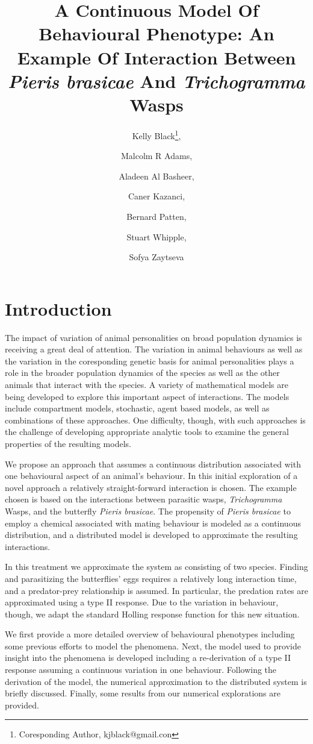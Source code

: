\documentclass[12pt]{article}
\title{A Continuous Model Of Behavioural Phenotype: An Example Of
  Interaction Between \textit{Pieris brasicae} And
  \textit{Trichogramma} Wasps}
\author{Kelly Black\thanks{Coresponding Author, kjblack@gmail.con},
  \and Malcolm R Adams, \and Aladeen Al Basheer, \and Caner Kazanci,
  \and Bernard Patten, \and Stuart Whipple, \and Sofya Zaytseva}
\begin{document}
\maketitle

\section{Introduction}

The impact of variation of animal personalities on broad population
dynamics is receiving a great deal of
attention\cite{doi:10.1111/j.1461-0248.2010.01536.x}.  The variation
in animal behaviours as well as the variation in the coresponding
genetic basis for animal personalities plays a role in the broader
population dynamics of the species as well as the other animals that
interact with the species. A variety of mathematical models are being
developed to explore this important aspect of interactions. The models
include compartment models, stochastic, agent based models, as well as
combinations of these approaches. One difficulty, though, with such
approaches is the challenge of developing appropriate analytic tools
to examine the general properties of the resulting models.

We propose an approach that assumes a continuous distribution
associated with one behavioural aspect of an animal's behaviour. In
this initial exploration of a novel approach a relatively
straight-forward interaction is chosen. The example chosen is based on
the interactions between parasitic wasps, \textit{Trichogramma} Wasps,
and the butterfly \textit{Pieris
  brasicae}\cite{10.1093/beheco/arq007}.  The propensity of
\textit{Pieris brasicae} to employ a chemical associated with mating
behaviour is modeled as a continuous distribution, and a distributed
model is developed to approximate the resulting interactions.

In this treatment we approximate the system as consisting of two
species. Finding and parasitizing the butterflies' eggs requires a
relatively long interaction time, and a predator-prey relationship is
assumed. In particular, the predation rates are approximated using a
type II response. Due to the variation in behaviour, though, we adapt
the standard Holling response function for this new situation.

We first provide a more detailed overview of behavioural phenotypes
including some previous efforts to model the phenomena. Next, the
model used to provide insight into the phenomena is developed
including a re-derivation of a type II response assuming a continuous
variation in one behaviour. Following the derivation of the model, the
numerical approximation to the distributed system is briefly
discussed. Finally, some results from our numerical explorations are
provided.
\end{document}
